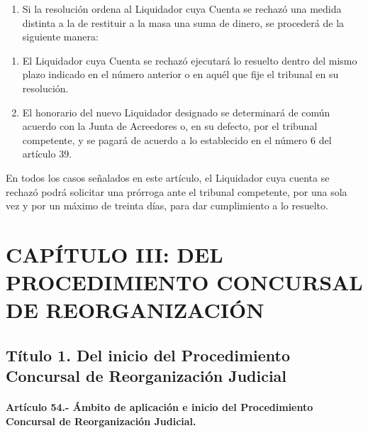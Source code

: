 \documentclass[
]{book}
\providecommand{\tightlist}{%
  \setlength{\itemsep}{0pt}\setlength{\parskip}{0pt}}
\begin{document}
\begin{enumerate}
\def\labelenumi{\arabic{enumi})}
\setcounter{enumi}{1}
\tightlist
\item
  Si la resolución ordena al Liquidador cuya Cuenta se rechazó una medida distinta a la de restituir a la masa una suma de dinero, se procederá de la siguiente manera:
\end{enumerate}

\begin{enumerate}
\def\labelenumi{\alph{enumi})}
\item
  El Liquidador cuya Cuenta se rechazó ejecutará lo resuelto dentro del mismo plazo indicado en el número anterior o en aquél que fije el tribunal en su resolución.
\item
  El honorario del nuevo Liquidador designado se determinará de común acuerdo con la Junta de Acreedores o, en su defecto, por el tribunal competente, y se pagará de acuerdo a lo establecido en el número 6 del artículo 39.
\end{enumerate}

En todos los casos señalados en este artículo, el Liquidador cuya cuenta se rechazó podrá solicitar una prórroga ante el tribunal competente, por una sola vez y por un máximo de treinta días, para dar cumplimiento a lo resuelto.

\hypertarget{capuxedtulo-iii-del-procedimiento-concursal-de-reorganizaciuxf3n}{%
\section*{CAPÍTULO III: DEL PROCEDIMIENTO CONCURSAL DE REORGANIZACIÓN}\label{capuxedtulo-iii-del-procedimiento-concursal-de-reorganizaciuxf3n}}

\hypertarget{tuxedtulo-1.-del-inicio-del-procedimiento-concursal-de-reorganizaciuxf3n-judicial}{%
\subsection*{Título 1. Del inicio del Procedimiento Concursal de Reorganización Judicial}\label{tuxedtulo-1.-del-inicio-del-procedimiento-concursal-de-reorganizaciuxf3n-judicial}}

\hypertarget{artuxedculo-54.--uxe1mbito-de-aplicaciuxf3n-e-inicio-del-procedimiento-concursal-de-reorganizaciuxf3n-judicial.}{%
\paragraph*{Artículo 54.- Ámbito de aplicación e inicio del Procedimiento Concursal de Reorganización Judicial.}\label{artuxedculo-54.--uxe1mbito-de-aplicaciuxf3n-e-inicio-del-procedimiento-concursal-de-reorganizaciuxf3n-judicial.}}
\end{document}
